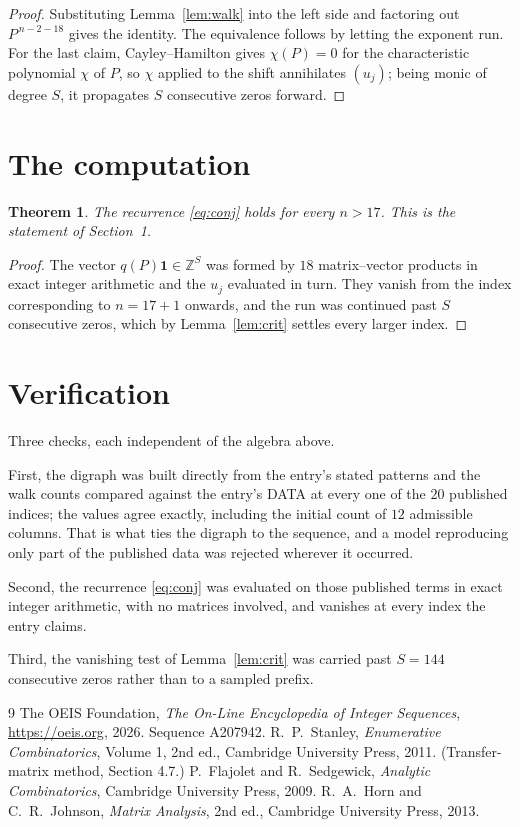 \documentclass[11pt,a4paper]{article}
\theoremstyle{plain}
\newtheorem{theorem}{Theorem}
\theoremstyle{definition}
\begin{document}
\begin{proof}
Substituting Lemma~\ref{lem:walk} into the left side and factoring out
$P^{\,n-2-18}$ gives the identity. The equivalence follows by letting the exponent
run. For the last claim, Cayley--Hamilton gives $\chi(P)=0$ for the characteristic
polynomial $\chi$ of $P$, so $\chi$ applied to the shift annihilates $(u_j)$; being monic of
degree $S$, it propagates $S$ consecutive zeros forward.
\end{proof}

\section{The computation}

\begin{theorem}
The recurrence \eqref{eq:conj} holds for every $n>17$. This is the statement of
Section~1.
\end{theorem}

\begin{proof}
The vector $q(P)\mathbf{1}\in\mathbb{Z}^{S}$ was formed by $18$ matrix--vector
products in exact integer arithmetic and the $u_j$ evaluated in turn. They vanish from the
index corresponding to $n=17+1$ onwards, and the run was continued past $S$ consecutive
zeros, which by Lemma~\ref{lem:crit} settles every larger index.
\end{proof}

\section{Verification}

Three checks, each independent of the algebra above.

First, the digraph was built directly from the entry's stated patterns and the walk counts
compared against the entry's DATA at every one of the $20$ published indices; the
values agree exactly, including the initial count of $12$ admissible columns. That is
what ties the digraph to the sequence, and a model reproducing only part of the published
data was rejected wherever it occurred.

Second, the recurrence \eqref{eq:conj} was evaluated on those published terms in exact
integer arithmetic, with no matrices involved, and vanishes at every index the entry claims.

Third, the vanishing test of Lemma~\ref{lem:crit} was carried past $S=144$ consecutive
zeros rather than to a sampled prefix.

\begin{thebibliography}{9}
 The OEIS Foundation, \emph{The On-Line Encyclopedia of Integer
Sequences}, \url{https://oeis.org}, 2026. Sequence A207942.
 R.~P.~Stanley, \emph{Enumerative Combinatorics}, Volume 1, 2nd ed.,
Cambridge University Press, 2011. (Transfer-matrix method, Section 4.7.)
 P.~Flajolet and R.~Sedgewick, \emph{Analytic Combinatorics}, Cambridge
University Press, 2009.
 R.~A.~Horn and C.~R.~Johnson, \emph{Matrix Analysis}, 2nd ed., Cambridge
University Press, 2013.
\end{thebibliography}
\end{document}
